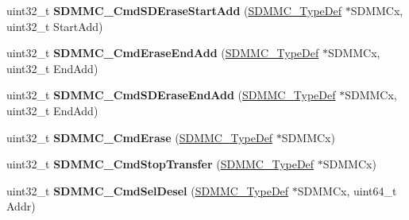 \begin{DoxyCompactItemize}
\mbox{\label{group___h_a_l___s_d_m_m_c___l_l___group3_ga090abbcbd987ed610bbfd22d151ae6ff}} 
uint32\+\_\+t {\bfseries S\+D\+M\+M\+C\+\_\+\+Cmd\+S\+D\+Erase\+Start\+Add} (\mbox{\hyperlink{struct_s_d_m_m_c___type_def}{S\+D\+M\+M\+C\+\_\+\+Type\+Def}} $\ast$S\+D\+M\+M\+Cx, uint32\+\_\+t Start\+Add)
\item 
\mbox{\label{group___h_a_l___s_d_m_m_c___l_l___group3_ga9f6f49d572ba197fc921002c34a31cc8}} 
uint32\+\_\+t {\bfseries S\+D\+M\+M\+C\+\_\+\+Cmd\+Erase\+End\+Add} (\mbox{\hyperlink{struct_s_d_m_m_c___type_def}{S\+D\+M\+M\+C\+\_\+\+Type\+Def}} $\ast$S\+D\+M\+M\+Cx, uint32\+\_\+t End\+Add)
\item 
\mbox{\label{group___h_a_l___s_d_m_m_c___l_l___group3_ga3a590ead130fbd07fdc57711c6d42ada}} 
uint32\+\_\+t {\bfseries S\+D\+M\+M\+C\+\_\+\+Cmd\+S\+D\+Erase\+End\+Add} (\mbox{\hyperlink{struct_s_d_m_m_c___type_def}{S\+D\+M\+M\+C\+\_\+\+Type\+Def}} $\ast$S\+D\+M\+M\+Cx, uint32\+\_\+t End\+Add)
\item 
\mbox{\label{group___h_a_l___s_d_m_m_c___l_l___group3_ga27169039db6e87e5cb99c0f80731277d}} 
uint32\+\_\+t {\bfseries S\+D\+M\+M\+C\+\_\+\+Cmd\+Erase} (\mbox{\hyperlink{struct_s_d_m_m_c___type_def}{S\+D\+M\+M\+C\+\_\+\+Type\+Def}} $\ast$S\+D\+M\+M\+Cx)
\item 
\mbox{\label{group___h_a_l___s_d_m_m_c___l_l___group3_gac75479d040cf3a1a83c28fb3724e2ab6}} 
uint32\+\_\+t {\bfseries S\+D\+M\+M\+C\+\_\+\+Cmd\+Stop\+Transfer} (\mbox{\hyperlink{struct_s_d_m_m_c___type_def}{S\+D\+M\+M\+C\+\_\+\+Type\+Def}} $\ast$S\+D\+M\+M\+Cx)
\item 
\mbox{\label{group___h_a_l___s_d_m_m_c___l_l___group3_ga082b574da9d0ac63523ebdf67050ed15}} 
uint32\+\_\+t {\bfseries S\+D\+M\+M\+C\+\_\+\+Cmd\+Sel\+Desel} (\mbox{\hyperlink{struct_s_d_m_m_c___type_def}{S\+D\+M\+M\+C\+\_\+\+Type\+Def}} $\ast$S\+D\+M\+M\+Cx, uint64\+\_\+t Addr)
\item 
\mbox{\label{group___h_a_l___s_d_m_m_c___l_l___group3_ga6c01b16dfbe3041cf37b40159241dd3f}} 

\end{DoxyCompactItemize}
